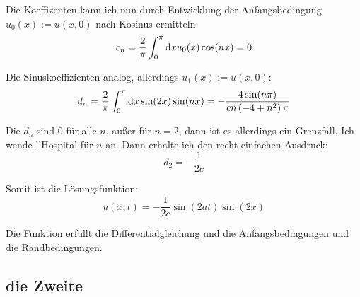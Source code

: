 \documentclass[11pt, ngerman, fleqn]{article}
\begin{document}
Die Koeffizenten kann ich nun durch Entwicklung der Anfangsbedingung $u_0(x) :=
u(x, 0)$ nach Kosinus ermitteln:
\[
	c_n = \frac 2\pi \int_0^\pi \dif x u_0(x) \cos(nx) = 0
\]

Die Sinuskoeffizienten analog, allerdings $u_1(x) := \dot u(x, 0)$:
\[
	d_n = \frac 2\pi \int_0^\pi \dif x \sin(2x) \sin(nx) = - \frac{4 \sin(n \pi)}{cn \del{-4 + n^2} \pi}
\]

Die $d_n$ sind 0 für alle $n$, außer für $n = 2$, dann ist es allerdings ein
Grenzfall. Ich wende l'Hospital für $n$ an. Dann erhalte ich den recht einfachen Ausdruck:
\[
	d_2 = - \frac{1}{2c}
\]

Somit ist die Lösungsfunktion:
\[
	u(x, t) = - \frac{1}{2c} \sin(2at) \sin(2x)
\]

Die Funktion erfüllt die Differentialgleichung und die Anfangsbedingungen und
die Randbedingungen.

\subsection{die Zweite}



\end{document}
